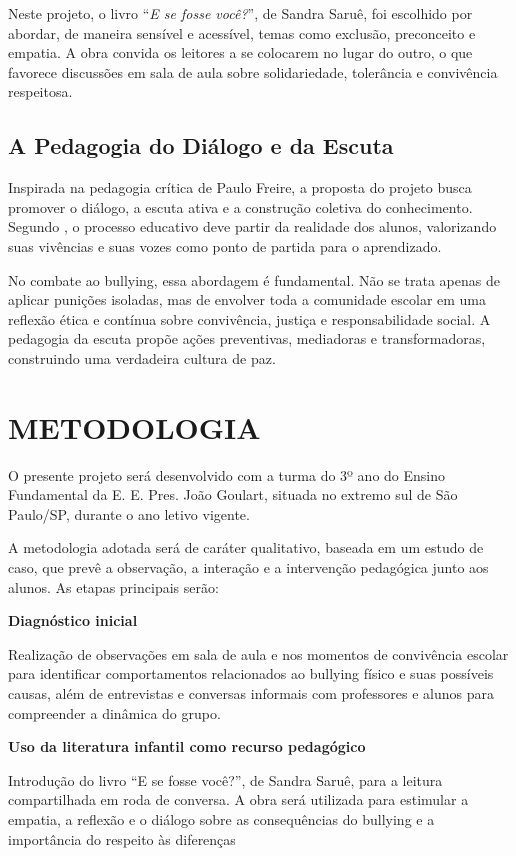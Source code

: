 			Neste projeto, o livro “\textit{E se fosse você?}”, de Sandra Saruê, foi escolhido por abordar, de maneira sensível e acessível, temas como exclusão, preconceito e empatia. A obra convida os leitores a se colocarem no lugar do outro, o que favorece discussões em sala de aula sobre solidariedade, tolerância e convivência respeitosa. 
			
		\subsection{A Pedagogia do Diálogo e da Escuta}
			Inspirada na pedagogia crítica de Paulo Freire, a proposta do projeto busca promover o diálogo, a escuta ativa e a construção coletiva do conhecimento. Segundo , o processo educativo deve partir da realidade dos alunos, valorizando suas vivências e suas vozes como ponto de partida para o aprendizado.
			
			No combate ao bullying, essa abordagem é fundamental. Não se trata apenas de aplicar punições isoladas, mas de envolver toda a comunidade escolar em uma reflexão ética e contínua sobre convivência, justiça e responsabilidade social. A pedagogia da escuta propõe ações preventivas, mediadoras e transformadoras, construindo uma verdadeira cultura de paz.
	
	
	\section{METODOLOGIA}
	
		O presente projeto será desenvolvido com a turma do 3º ano do Ensino Fundamental da E. E. Pres. João Goulart, situada no extremo sul de São Paulo/SP, durante o ano letivo vigente.
		
		A metodologia adotada será de caráter qualitativo, baseada em um estudo de caso, que prevê a observação, a interação e a intervenção pedagógica junto aos alunos. As etapas principais serão:
		
		\textbf{Diagnóstico inicial}
		
		Realização de observações em sala de aula e nos momentos de convivência escolar para identificar comportamentos relacionados ao bullying físico e suas possíveis causas, além de entrevistas e conversas informais com professores e alunos para compreender a dinâmica do grupo.
		
		\textbf{Uso da literatura infantil como recurso pedagógico}
		
		Introdução do livro “E se fosse você?”, de Sandra Saruê, para a leitura compartilhada em roda de conversa. A obra será utilizada para estimular a empatia, a reflexão e o diálogo sobre as consequências do bullying e a importância do respeito às diferenças
		

